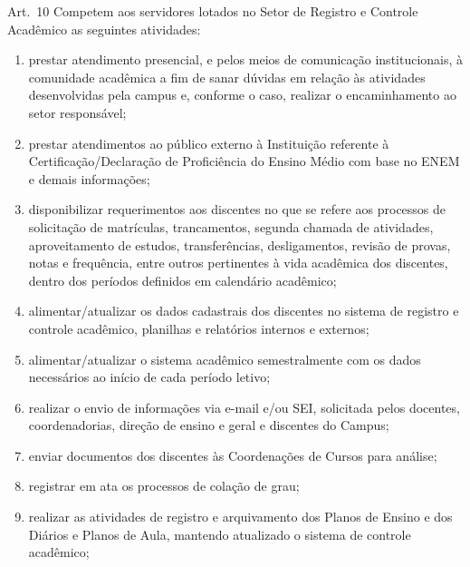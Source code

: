 \documentclass[a4paper,12pt]{report}
\begin{document}
Art.~10 Competem aos servidores lotados no Setor de Registro e Controle Acadêmico as 
        seguintes atividades:

\begin{enumerate}
\renewcommand{\labelenumi}{\Roman{enumi}}

\item prestar atendimento presencial, e pelos meios de comunicação institucionais, à 
      comunidade acadêmica a fim de  sanar dúvidas em relação às atividades desenvolvidas 
      pela campus e, conforme o caso, realizar o encaminhamento ao setor responsável;

\item prestar atendimentos ao público externo à Instituição referente à  
      Certificação/Declaração de Proficiência do Ensino Médio com base no ENEM e demais 
      informações;

\item disponibilizar requerimentos aos discentes no que se refere aos processos de     
      solicitação de matrículas, trancamentos, segunda chamada de atividades, aproveitamento 
      de estudos, transferências, desligamentos, revisão de provas, notas e frequência, 
      entre outros pertinentes à vida acadêmica dos discentes, dentro dos períodos 
      definidos em calendário acadêmico; 

\item alimentar/atualizar os dados cadastrais dos discentes no sistema de registro e 
      controle acadêmico, planilhas e relatórios internos e externos;

\item alimentar/atualizar o sistema acadêmico semestralmente com os dados necessários ao  
      início de cada período letivo;

\item realizar o envio de informações via e-mail e/ou SEI, solicitada pelos docentes, 
      coordenadorias, direção de ensino e geral e discentes do Campus;

\item enviar documentos dos discentes às Coordenações de Cursos para análise;

\item registrar em ata os processos de colação de grau;

\item realizar as atividades de registro e arquivamento dos Planos de Ensino e dos Diários 
      e Planos de Aula, mantendo atualizado o sistema de controle acadêmico;
      

\end{enumerate}
\end{document}
